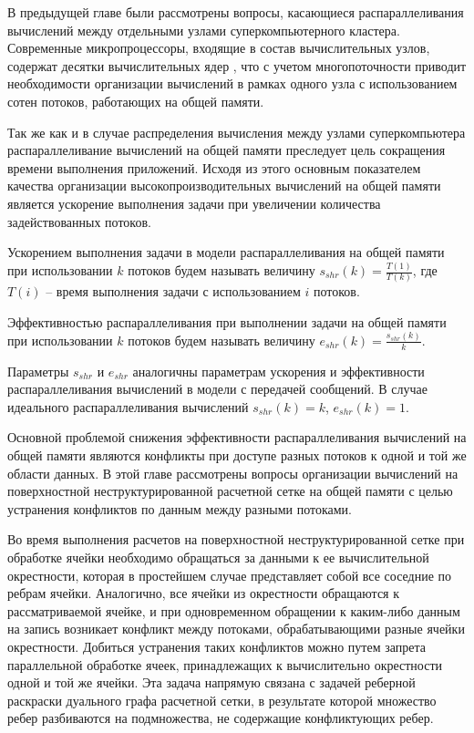 В предыдущей главе были рассмотрены вопросы, касающиеся распараллеливания вычислений между отдельными узлами суперкомпьютерного кластера.
Современные микропроцессоры, входящие в состав вычислительных узлов, содержат десятки вычислительных ядер \cite{Section3IntroIntel,Section3IntroAMD,Kuzminsky2022ARM}, что с учетом многопоточности приводит необходимости организации вычислений в рамках одного узла с использованием сотен потоков, работающих на общей памяти.

Так же как и в случае распределения вычисления между узлами суперкомпьютера распараллеливание вычислений на общей памяти преследует цель сокращения времени выполнения приложений.
Исходя из этого основным показателем качества организации высокопроизводительных вычислений на общей памяти является ускорение выполнения задачи при увеличении количества задействованных потоков.

\begin{definition}
Ускорением выполнения задачи в модели распараллеливания на общей памяти\label{term:shr_speedup} при использовании $k$ потоков будем называть величину $s_{shr}(k) = \frac{T(1)}{T(k)}$, где $T(i)$ -- время выполнения задачи с использованием $i$ потоков.
\end{definition}

\begin{definition}
Эффективностью распараллеливания при выполнении задачи на общей памяти\label{term:shr_eff} при использовании $k$ потоков будем называть величину $e_{shr}(k) = \frac{s_{shr}(k)}{k}$.
\end{definition}

Параметры $s_{shr}$ и $e_{shr}$ аналогичны параметрам ускорения\label{term:msg_speedup3} и эффективности\label{term:msh_eff3} распараллеливания вычислений в модели с передачей сообщений.
В случае идеального распараллеливания вычислений $s_{shr}(k) = k$, $e_{shr}(k) = 1$.

Основной проблемой снижения эффективности распараллеливания вычислений на общей памяти являются конфликты при доступе разных потоков к одной и той же области данных.
В этой главе рассмотрены вопросы организации вычислений на поверхностной неструктурированной расчетной сетке\label{term:unstruct_surf_calc_mesh6} на общей памяти с целью устранения конфликтов по данным между разными потоками.

Во время выполнения расчетов на поверхностной неструктурированной сетке при обработке ячейки необходимо обращаться за данными к ее вычислительной окрестности\label{term:cell_calc_template3}, которая в простейшем случае представляет собой все соседние по ребрам ячейки.
Аналогично, все ячейки из окрестности обращаются к рассматриваемой ячейке, и при одновременном обращении к каким-либо данным на запись возникает конфликт между потоками, обрабатывающими разные ячейки окрестности.
Добиться устранения таких конфликтов можно путем запрета параллельной обработке ячеек, принадлежащих к вычислительно окрестности одной и той же ячейки.
Эта задача напрямую связана с задачей реберной раскраски дуального графа расчетной сетки, в результате которой множество ребер разбиваются на подмножества, не содержащие конфликтующих ребер.

